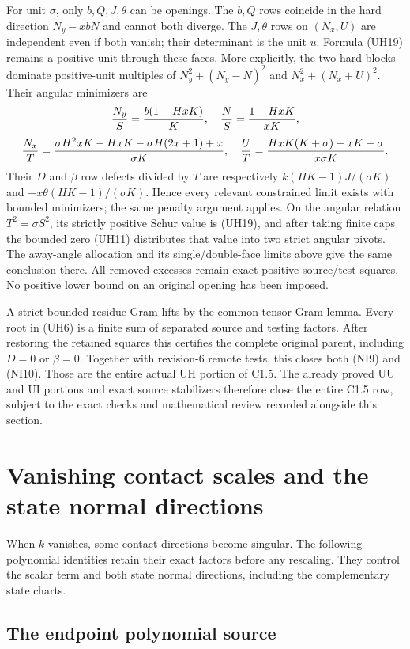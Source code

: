 For unit $\sigma$, only $b,Q,J,\theta$ can be openings.
The $b,Q$ rows coincide in the hard direction $N_y-xbN$ and cannot
both diverge. The $J,\theta$ rows on $(N_x,U)$ are independent even
if both vanish; their determinant is the unit $u$. Formula (UH19)
remains a positive unit through these faces. More explicitly, the
two hard blocks dominate positive-unit multiples of
$N_y^2+(N_y-N)^2$ and $N_x^2+(N_x+U)^2$. Their angular minimizers are
\[
 {N_y\over S}={b(1-HxK)\over K},\quad
 {N\over S}={1-HxK\over xK},
\]
\[
 {N_x\over T}={\sigma H^2xK-HxK-\sigma H(2x+1)+x\over\sigma K},
 \quad {U\over T}={HxK(K+\sigma)-xK-\sigma\over x\sigma K}.
\]
Their $D$ and $\beta$ row defects divided by $T$ are respectively
$k(HK-1)J/(\sigma K)$ and $-x\theta(HK-1)/(\sigma K)$.
Hence every relevant constrained limit exists with bounded
minimizers; the same penalty argument applies. On the angular
relation $T^2=\sigma S^2$, its strictly positive Schur value is
(UH19), and after taking finite caps the bounded zero (UH11)
distributes that value into two strict angular pivots. The away-angle
allocation and its single/double-face limits above give the same
conclusion there. All removed excesses remain exact positive
source/test squares. No positive lower bound on an original opening
has been imposed.

A strict bounded residue Gram lifts by the common tensor Gram
lemma. Every root in (UH6) is a finite sum of separated source and
testing factors. After restoring the retained squares this certifies
the complete original parent, including $D=0$ or $\beta=0$.
Together with revision-6 remote tests, this closes both (NI9) and
(NI10). Those are the entire actual UH portion of C1.5. The already
proved UU and UI portions and exact source stabilizers therefore close
the entire C1.5 row, subject to the exact checks and mathematical review
recorded alongside this section.



\section{Vanishing contact scales and the state normal directions}
When $k$ vanishes, some contact directions become singular. The following polynomial identities retain their exact factors before any rescaling. They control the scalar term and both state normal directions, including the complementary state charts.

\subsection{The endpoint polynomial source}

